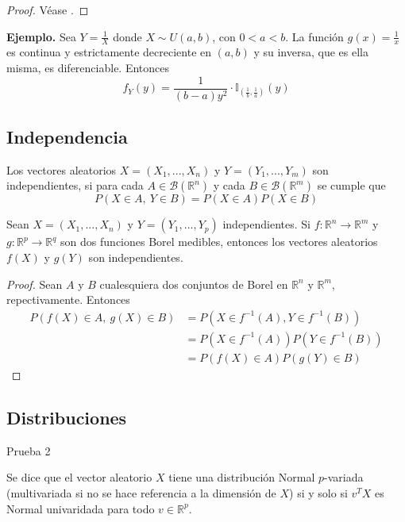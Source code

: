 \begin{proof}
    Véase \cite{rinconCursoIntermedioProbabilidad2007}.
\end{proof}

\noindent\textbf{Ejemplo.} Sea $Y=\frac{1}{X}$ donde $X\sim U(a,b)$, 
con $0<a<b$. La función $g(x) = \frac{1}{x}$ es continua y 
estrictamente decreciente en $(a,b)$ y su inversa, que es ella
misma, es diferenciable. Entonces 
$$f_Y(y) = \frac{1}{(b-a)y^2}
\cdot \mathbb I_{\left(\frac{1}{b},\frac{1}{a}\right)}(y)$$

\subsection{Independencia}

\begin{definition}
    Los vectores aleatorios $X=(X_1,...,X_n)$ y $Y=(Y_1,...,Y_m)$
    son independientes, si para cada $A\in \mathcal B(\mathbb R^n)$
    y cada $B\in \mathcal B(\mathbb R^m)$ se cumple que
    $$P(X\in A,\ Y\in B)=P(X\in A)P(X\in B)$$
\end{definition}

\begin{proposition}\label{prop:fun_vect_indep}
    Sean $X=(X_1,...,X_n)$ y $Y=(Y_1,...,Y_p)$ independientes. Si 
    $f:\mathbb R^n \to \mathbb R^m$ y $g:\mathbb R^p \to \mathbb R^q$
    son dos funciones Borel medibles, entonces los vectores
    aleatorios $f(X)$ y $g(Y)$ son independientes.
\end{proposition}

\begin{proof}
    Sean $A$ y $B$ cualesquiera dos conjuntos de Borel en $\mathbb R^n$
    y $\mathbb R^m$, repectivamente. Entonces
    \begin{align*}
        P(f(X)\in A,\ g(X)\in B)&= P(X\in f^{-1}(A),Y\in f^{-1}(B))\\
        &=  P(X\in f^{-1}(A))P(Y\in f^{-1}(B))\\
        &=  P(f(X)\in A)P(g(Y)\in B)
    \end{align*}
\end{proof}

\subsection{Distribuciones}

Prueba 2

\begin{definition}
    Se dice que el vector aleatorio $X$ tiene una distribución
    Normal $p$-variada (multivariada si no se hace referencia 
    a la dimensión de $X$) si y solo si $v^TX$ es Normal univaridada
    para todo $v\in \mathbb R^p$.
\end{definition}

